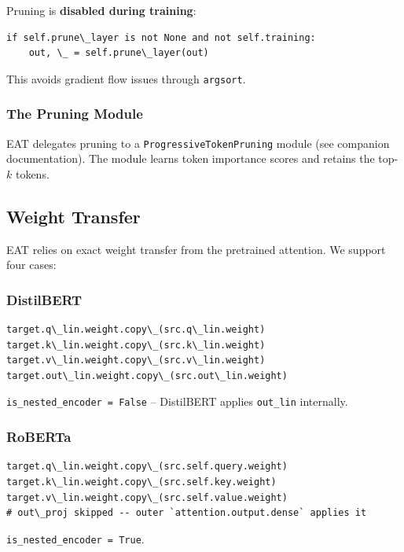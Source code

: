 Pruning is \textbf{disabled during training}:

\begin{lstlisting}
if self.prune\_layer is not None and not self.training:
    out, \_ = self.prune\_layer(out)
\end{lstlisting}

This avoids gradient flow issues through \texttt{argsort}.

\subsubsection{The Pruning Module}

EAT delegates pruning to a \texttt{ProgressiveTokenPruning} module (see companion 
documentation). The module learns token importance scores and retains the 
top-$k$ tokens.

\subsection{Weight Transfer}

EAT relies on exact weight transfer from the pretrained attention. We 
support four cases:

\subsubsection{DistilBERT}

\begin{lstlisting}
target.q\_lin.weight.copy\_(src.q\_lin.weight)
target.k\_lin.weight.copy\_(src.k\_lin.weight)
target.v\_lin.weight.copy\_(src.v\_lin.weight)
target.out\_lin.weight.copy\_(src.out\_lin.weight)
\end{lstlisting}

\texttt{is\_nested\_encoder = False} -- DistilBERT applies \texttt{out\_lin} internally.

\subsubsection{RoBERTa}

\begin{lstlisting}
target.q\_lin.weight.copy\_(src.self.query.weight)
target.k\_lin.weight.copy\_(src.self.key.weight)
target.v\_lin.weight.copy\_(src.self.value.weight)
# out\_proj skipped -- outer `attention.output.dense` applies it
\end{lstlisting}

\texttt{is\_nested\_encoder = True}.

